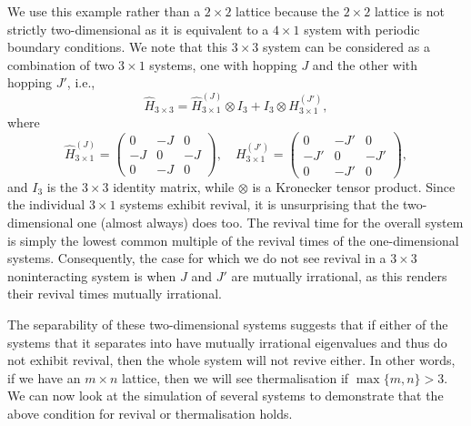 \documentclass[a4paper, 10pt]{article}
\theoremstyle{plain}
\begin{document}
We use this example rather than a $2 \times 2$ lattice because the $2 \times 2$
lattice is not strictly two-dimensional as it is equivalent to a $4 \times 1$
system with periodic boundary conditions. We note that this $3 \times 3$ system
can be considered as a combination of two $3 \times 1$ systems, one with hopping
$J$ and the other with hopping $J'$, i.e.,
\begin{equation}
 \hat{H}_{3 \times 3}
 =
 \hat{H}_{3 \times 1}^{(J)} \otimes {I}_{3}  +
 {I}_{3} \otimes H_{3 \times 1}^{(J')},
\end{equation}
where
\begin{equation}
    \hat{H}_{3\times1}^{(J)}
    =
    \begin{pmatrix}
         0 & -J &  0 \\
        -J &  0 & -J \\
         0 & -J &  0
    \end{pmatrix},
    \quad
    H_{3\times1}^{(J')}
    =
    \begin{pmatrix}
         0 & -J' &  0  \\
        -J' &  0 & -J' \\
         0 & -J' &  0
    \end{pmatrix},
\end{equation}
and $I_{3}$ is the $3 \times 3$ identity matrix, while $\otimes$ is a Kronecker
tensor product. Since the individual $3 \times 1$ systems exhibit revival, it is
unsurprising that the two-dimensional one (almost always) does too. The revival
time for the overall system is simply the lowest common multiple of the revival
times of the one-dimensional systems. Consequently, the case for which we do
not see revival in a $3\times3$ noninteracting system is when $J$ and $J'$ are
mutually irrational, as this renders their revival times mutually irrational.

The separability of these two-dimensional systems suggests that if either of the
systems that it separates into have mutually irrational eigenvalues and thus do
not exhibit revival, then the whole system will not revive either. In other
words, if we have an $m \times n$ lattice, then we will see thermalisation if
$\max{\lbrace m,n \rbrace} > 3$. We can now look at the simulation of several
systems to demonstrate that the above condition for revival or thermalisation
holds.
\end{document}
